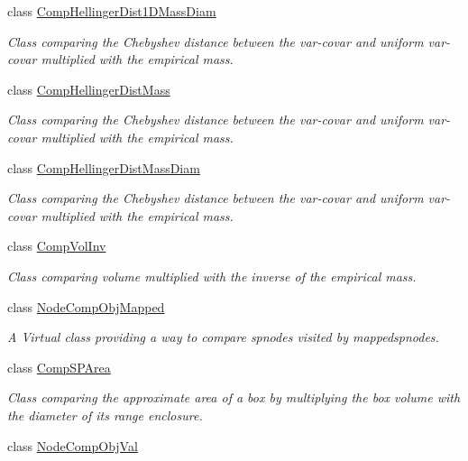 \begin{DoxyCompactItemize}
class \hyperlink{classsubpavings_1_1CompHellingerDist1DMassDiam}{\-Comp\-Hellinger\-Dist1\-D\-Mass\-Diam}
\begin{DoxyCompactList}\small\item\em \-Class comparing the \-Chebyshev distance between the var-\/covar and uniform var-\/covar multiplied with the empirical mass. \end{DoxyCompactList}\item 
class \hyperlink{classsubpavings_1_1CompHellingerDistMass}{\-Comp\-Hellinger\-Dist\-Mass}
\begin{DoxyCompactList}\small\item\em \-Class comparing the \-Chebyshev distance between the var-\/covar and uniform var-\/covar multiplied with the empirical mass. \end{DoxyCompactList}\item 
class \hyperlink{classsubpavings_1_1CompHellingerDistMassDiam}{\-Comp\-Hellinger\-Dist\-Mass\-Diam}
\begin{DoxyCompactList}\small\item\em \-Class comparing the \-Chebyshev distance between the var-\/covar and uniform var-\/covar multiplied with the empirical mass. \end{DoxyCompactList}\item 
class \hyperlink{classsubpavings_1_1CompVolInv}{\-Comp\-Vol\-Inv}
\begin{DoxyCompactList}\small\item\em \-Class comparing volume multiplied with the inverse of the empirical mass. \end{DoxyCompactList}\item 
class \hyperlink{classsubpavings_1_1NodeCompObjMapped}{\-Node\-Comp\-Obj\-Mapped}
\begin{DoxyCompactList}\small\item\em \-A \-Virtual class providing a way to compare spnodes visited by mappedspnodes. \end{DoxyCompactList}\item 
class \hyperlink{classsubpavings_1_1CompSPArea}{\-Comp\-S\-P\-Area}
\begin{DoxyCompactList}\small\item\em \-Class comparing the approximate area of a box by multiplying the box volume with the diameter of its range enclosure. \end{DoxyCompactList}\item 
class \hyperlink{classsubpavings_1_1NodeCompObjVal}{\-Node\-Comp\-Obj\-Val}

\end{DoxyCompactItemize}
